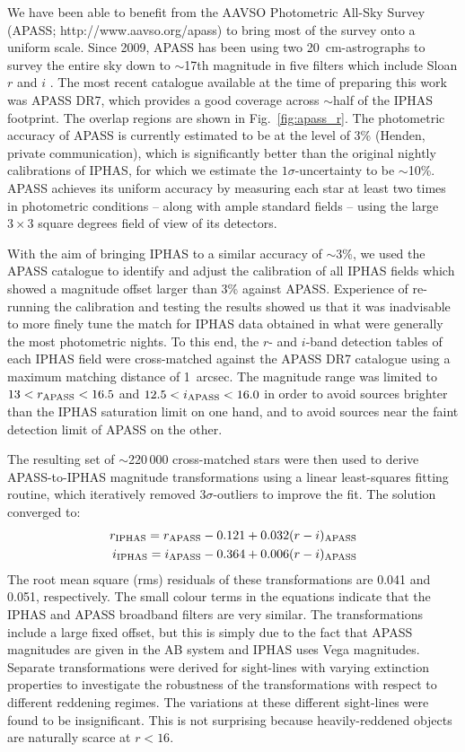 \documentclass[useAMS,usenatbib]{mn2e}
\begin{document}
We have been able to benefit from the
AAVSO Photometric All-Sky Survey
(APASS; http://www.aavso.org/apass)
to bring 
most of the survey 
onto a uniform scale.
Since 2009,
APASS has been using two 20~cm-astrographs
to survey the entire sky down to $\sim$17th magnitude
in five filters which include Sloan $r$ and $i$ \citep{Henden2012}.
The most recent catalogue available 
at the time of preparing this work was APASS DR7,
which provides a good coverage across $\sim$half
of the IPHAS footprint.
The overlap regions are shown in Fig.~\ref{fig:apass_r}.
The photometric accuracy of APASS is currently estimated 
to be at the level of 3\% (Henden, private communication),
which is significantly better 
than the original nightly calibrations of IPHAS,
for which we estimate the $1\sigma$-uncertainty to be $\sim$10\%.
APASS achieves its uniform accuracy 
by measuring each star at least two times in photometric conditions
-- along with ample standard fields --
using the large $3\times3$ square degrees field of view of its detectors.

With the aim of bringing IPHAS to a similar accuracy of $\sim$3\%,
we used the APASS catalogue to identify and adjust the calibration of all IPHAS fields 
which showed a magnitude offset larger than 3\% against APASS.  Experience of re-running
the calibration and testing the results showed us that it was inadvisable to more
finely tune the match for IPHAS data obtained in what were generally the most photometric
nights.  To this end,
the $r$- and $i$-band detection tables of each IPHAS field
were cross-matched against the APASS DR7 catalogue 
using a maximum matching distance of 1~arcsec.
The magnitude range was limited to
$13<r_{\rm APASS}<16.5$ and $12.5<i_{\rm APASS}<16.0$
in order to avoid sources 
brighter than the IPHAS saturation limit on one hand, 
and to avoid sources near the faint detection limit of APASS 
on the other.

The resulting set of $\sim$220\,000 cross-matched stars were then used 
to derive APASS-to-IPHAS magnitude transformations
using a linear least-squares fitting routine, 
which iteratively removed $3\sigma$-outliers to improve the fit.
The solution converged to:
\begin{align} 
r_{\rm IPHAS} = r_{\rm APASS} - 0.121 + 0.032(r-i)_{\rm APASS} \label{eqn:apass_r} \\
i_{\rm IPHAS} = i_{\rm APASS} - 0.364 + 0.006(r-i)_{\rm APASS} \label{eqn:apass_i}
\end{align}
The root mean square (rms) residuals of these transformations 
are 0.041 and 0.051, respectively.
The small colour terms in the equations
indicate that the IPHAS and APASS broadband filters 
are very similar.
The transformations include a large fixed offset,
but this is simply due to the fact that 
APASS magnitudes are given in the AB system
and IPHAS uses Vega magnitudes.
Separate transformations were derived for sight-lines 
with varying extinction properties to investigate the robustness
of the transformations with respect to different reddening regimes.
The variations at these different
sight-lines were found to be insignificant.
This is not surprising because heavily-reddened objects 
are naturally scarce at $r<16$.
\end{document}

